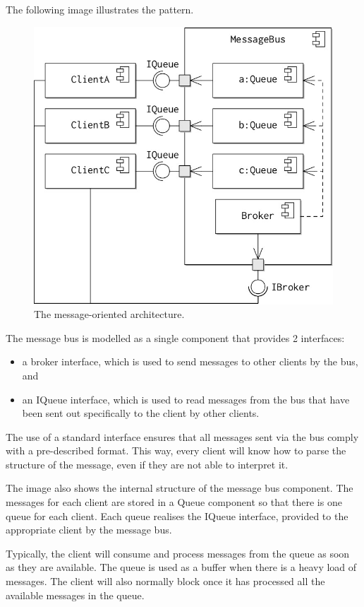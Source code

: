 \documentclass[a4paper, openany]{memoir}
\begin{document}
The following image illustrates the pattern.
\begin{figure}[H]
    \centering
    \includegraphics[scale=0.45]{src/14.9 Message.png}
    \caption{The message-oriented architecture.}
\end{figure}
\noindent The message bus is modelled as a single component that provides 2 interfaces:
\begin{itemize}
    \item a broker interface, which is used to send messages to other clients by the bus, and
    \item an IQueue interface, which is used to read messages from the bus that have been sent out specifically to the client by other clients.
\end{itemize}

The use of a standard interface ensures that all messages sent via the bus comply with a pre-described format. This way, every client will know how to parse the structure of the message, even if they are not able to interpret it. 

The image also shows the internal structure of the message bus component. The messages for each client are stored in a Queue component so that there is one queue for each client. Each queue realises the IQueue interface, provided to the appropriate client by the message bus. 

Typically, the client will consume and process messages from the queue as soon as they are available. The queue is used as a buffer when there is a heavy load of messages. The client will also normally block once it has processed all the available messages in the queue.
\end{document}
